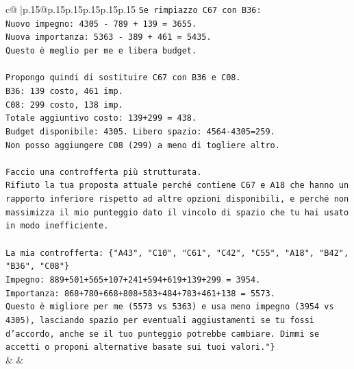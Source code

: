 \documentclass{article}
\begin{document}
{\begin{supertabular}{c@{$\;$}|p{.15\linewidth}@{}p{.15\linewidth}p{.15\linewidth}p{.15\linewidth}p{.15\linewidth}p{.15\linewidth}}
{{{\texttt{Se rimpiazzo C67 con B36:} \\
\texttt{Nuovo impegno: 4305 {-} 789 + 139 = 3655.} \\
\texttt{Nuova importanza: 5363 {-} 389 + 461 = 5435.} \\
\texttt{Questo è meglio per me e libera budget.} \\
\\ 
\texttt{Propongo quindi di sostituire C67 con B36 e C08.} \\
\texttt{B36: 139 costo, 461 imp.} \\
\texttt{C08: 299 costo, 138 imp.} \\
\texttt{Totale aggiuntivo costo: 139+299 = 438.} \\
\texttt{Budget disponibile: 4305. Libero spazio: 4564{-}4305=259.} \\
\texttt{Non posso aggiungere C08 (299) a meno di togliere altro.} \\
\\ 
\texttt{Faccio una controfferta più strutturata.} \\
\texttt{Rifiuto la tua proposta attuale perché contiene C67 e A18 che hanno un rapporto inferiore rispetto ad altre opzioni disponibili, e perché non massimizza il mio punteggio dato il vincolo di spazio che tu hai usato in modo inefficiente.} \\
\\ 
\texttt{La mia controfferta: \{"A43", "C10", "C61", "C42", "C55", "A18", "B42", "B36", "C08"\}} \\
\texttt{Impegno: 889+501+565+107+241+594+619+139+299 = 3954.} \\
\texttt{Importanza: 868+780+668+808+583+484+783+461+138 = 5573.} \\
\texttt{Questo è migliore per me (5573 vs 5363) e usa meno impegno (3954 vs 4305), lasciando spazio per eventuali aggiustamenti se tu fossi d'accordo, anche se il tuo punteggio potrebbe cambiare. Dimmi se accetti o proponi alternative basate sui tuoi valori."\}} \\
            }
        }
    }
    & & \\ \\


\end{supertabular}}
\end{document}
